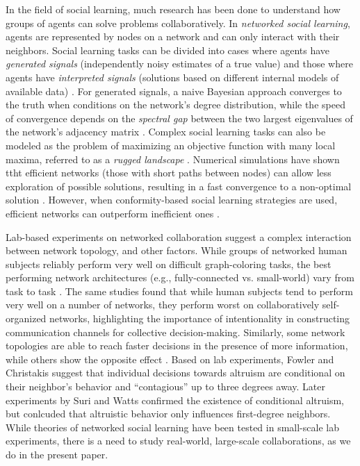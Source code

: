 \documentclass[10pt,twocolumn]{article}
\newcommand{\+}{\phantom{-}}
\begin{document}
In the field of social learning,
much research has been done to understand how groups of agents
can solve problems collaboratively.
In {\em networked social learning}, agents are represented by nodes on a network
and can only interact with their neighbors.
Social learning tasks can be divided into cases where agents have {\em generated signals}
(independently noisy estimates of a true value)
and those where agents have {\em interpreted signals}
(solutions based on different internal models of available data)
\cite{hong_interpreted_2009}.
For generated signals,
a naive Bayesian approach converges to the truth when conditions
on the network's degree distribution,
while the speed of convergence depends on the {\em spectral gap}
between the two largest eigenvalues of the network's adjacency matrix
\cite{golub_naive_2010}.
Complex social learning tasks can also be modeled as the problem
of maximizing an objective function with many local maxima,
referred to as a {\em rugged landscape}
\cite{lazer_network_2007, mason_propagation_2008, mason_collaborative_2012, grim_scientific_2013, barkoczi_social_2016}.
Numerical simulations have shown ttht efficient networks (those with short paths between nodes)
can allow less exploration of possible solutions,
resulting in a fast convergence to a non-optimal solution \cite{mason_propagation_2008, grim_scientific_2013}.
However, when conformity-based social learning strategies are used, efficient networks can outperform
inefficient ones \cite{barkoczi_social_2016}.

Lab-based experiments on networked collaboration
suggest a complex interaction between network topology,
and other factors.
While groups of networked human subjects reliably perform very well on
difficult graph-coloring tasks, the best performing network architectures
(e.g., fully-connected vs. small-world) vary
from task to task \cite{kearns_experiments_2012}.
The same studies found that while human subjects tend to perform very well on
a number of networks, they perform worst on collaboratively self-organized
networks, highlighting the importance of intentionality
in constructing communication channels for collective decision-making.
Similarly, some network topologies are able to reach faster decisions in the
presence of more information, while others show the opposite effect
\cite{kearns_experimental_2006}.
Based on lab experiments, Fowler and Christakis \cite{fowler_cooperative_2010}
suggest that individual decisions towards altruism are conditional on their
neighbor's behavior and ``contagious'' up to three degrees away.
Later experiments by Suri and Watts \cite{suri_cooperation_2011} confirmed the
existence of conditional altruism,
but conlcuded that altruistic
behavior only influences first-degree neighbors.
While theories of networked social learning have been tested in small-scale lab experiments,
there is a need to study real-world, large-scale collaborations,
as we do in the present paper.
\end{document}
